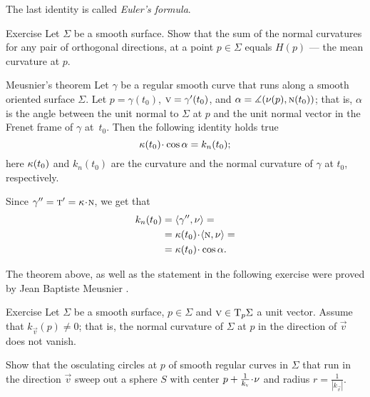 The last identity is called \emph{Euler's formula}.

\begin{thm}{Exercise}\label{ex:mean-curvature}
Let  $\Sigma$ be a smooth surface.
Show that the sum of the normal curvatures for any pair of orthogonal directions, at a point $p\in\Sigma$ equals $H(p)$ --- the mean curvature at $p$. 
\end{thm}




\begin{thm}{Meusnier's theorem}\label{thm:meusnier}
Let $\gamma$ be a regular smooth curve that runs along a smooth oriented surface $\Sigma$.
Let $p=\gamma(t_0)$, ${\vec v}\z=\gamma'(t_0)$, and $\alpha=\measuredangle(\nu(p),\text{\sc{n}}(t_0))$;
that is, $\alpha$ is the angle between the unit normal to $\Sigma$ at $p$ and the unit normal vector in the Frenet frame of $\gamma$ at~$t_0$.
Then the following identity holds true 
\[\kur(t_0)\cdot\cos\alpha=k_{n}(t_0);\]
here $\kappa(t_0)$  and $k_n(t_0)$ are the curvature and the normal curvature of $\gamma$ at $t_0$, respectively.  
\end{thm}


 Since $\gamma''=\tan'=\kur\cdot \norm$, we get that
\begin{align*}
k_{n}(t_0)&=\langle\gamma'',\Norm\rangle=
\\
&=\kur(t_0)\cdot\langle\norm,\Norm\rangle=
\\
&=\kur(t_0)\cdot\cos\alpha.
\end{align*}
\qedsf

The theorem above, as well as the statement in the following exercise were proved by Jean Baptiste Meusnier \cite{meusnier}.

\begin{thm}{Exercise}\label{ex:meusnier}
Let $\Sigma$ be a smooth surface, $p\in\Sigma$ and ${\text{\sc{v}}}\in \mathrm{T}_p\Sigma$ a unit vector.
Assume that $k_{\vec v}(p)\ne 0$; that is, the normal curvature of $\Sigma$ at $p$ in the direction of ${\vec v}$ does not vanish.

Show that the osculating circles at $p$ of smooth regular curves in $\Sigma$ that run in the direction ${\vec v}$ sweep out a sphere $S$ with center $p+\tfrac1{k_{\vec v}}\cdot\Norm$ and radius $r=\tfrac1{|k_{\vec v}|}$.
\end{thm}

